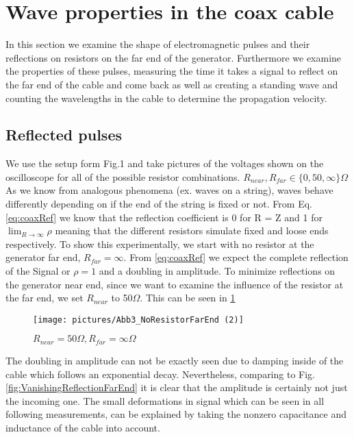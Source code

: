 \documentclass[a4paper,10pt,twocolumn]{article}
\begin{document}
    \section{Wave properties in the coax cable}
    In this section we examine the shape of electromagnetic pulses and their reflections on resistors on the far end of the generator.
    Furthermore we examine the properties of these pulses, measuring the time it takes a signal to reflect on the far end of the cable and come back as well as creating a standing wave and counting the wavelengths in the cable to determine the propagation velocity.
    
    \subsection{Reflected pulses}\label{subsec:WaveProperitesInTheCoax}
    We use the setup form Fig.1 and take pictures of the voltages shown on the oscilloscope for all of the possible resistor combinations. $R_{near}, R_{far} \in \{ 0,50,\infty\} \Omega$
    As we know from analogous phenomena (ex. waves on a string), waves behave differently depending on if the end of the string is fixed or not.
    From Eq. \ref{eq:coaxRef} we know that the reflection coefficient is 0 for R = Z and 1 for $\lim_{R \to \infty}\rho$ meaning that the different resistors simulate fixed and loose ends respectively.
    To show this experimentally, we start with no resistor at the generator far end, $R_{far} = \infty$.
    From \ref{eq:coaxRef} we expect the complete reflection of the Signal or $\rho = 1$ and a doubling in amplitude.
    To minimize reflections on the generator near end, since we want to examine the influence of the resistor at the far end, we set $R_{near}$ to 50$\Omega$.
    This can be seen in \ref{fig:NoResistorFarEnd}
    \begin{figure}[htbp]                                 %
        \begin{center}                                       %
            \texttt{[image: pictures/Abb3\_NoResistorFarEnd (2)]}      %
            \caption[]{$R_{near}=50\Omega, R_{far} = \infty \Omega$}   %
            \label{fig:NoResistorFarEnd}                                      %
        \end{center}
    \end{figure}
    The doubling in amplitude can not be exactly seen due to damping inside of the cable which follows an exponential decay.
    Nevertheless, comparing to Fig. \ref{fig:VanishingReflectionFarEnd} it is clear that the amplitude is certainly not just the incoming one.
    The small deformations in signal which can be seen in all following measurements, can be explained by taking the nonzero capacitance and inductance of the cable into account. 
    
\end{document}
